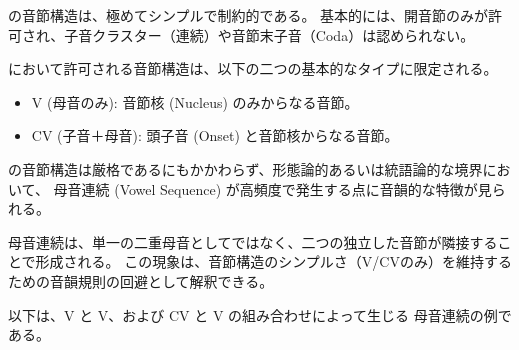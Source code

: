\langname の音節構造は、{極めてシンプルで制約的}である。
基本的には、開音節のみが許可され、子音クラスター（連続）や音節末子音（Coda）は認められない。

\langname において許可される音節構造は、以下の二つの基本的なタイプに限定される。

\begin{itemize}
    \item {V (母音のみ)}: 音節核 (Nucleus) のみからなる音節。
    \item {CV (子音＋母音)}: 頭子音 (Onset) と音節核からなる音節。
\end{itemize}

\langname の音節構造は厳格であるにもかかわらず、形態論的あるいは統語論的な境界において、
{母音連続 (Vowel Sequence)} が高頻度で発生する点に音韻的な特徴が見られる。

母音連続は、単一の二重母音としてではなく、二つの独立した音節が隣接することで形成される。
この現象は、音節構造のシンプルさ（V/CVのみ）を維持するための音韻規則の回避として解釈できる。

以下は、{V} と {V}、および {CV} と {V} の組み合わせによって生じる
母音連続の例である。

